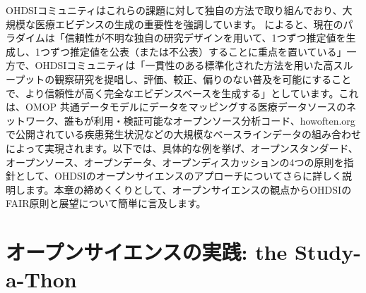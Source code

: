\documentclass[
  11pt]{book}
\theoremstyle{definition}
\theoremstyle{definition}
\theoremstyle{definition}
\theoremstyle{definition}
\theoremstyle{remark}
\begin{document}
OHDSIコミュニティはこれらの課題に対して独自の方法で取り組んでおり、大規模な医療エビデンスの生成の重要性を強調しています。 \citet{schuemie_2018b} によると、現在のパラダイムは「信頼性が不明な独自の研究デザインを用いて、1つずつ推定値を生成し、1つずつ推定値を公表（または不公表）することに重点を置いている」一方で、OHDSIコミュニティは「一貫性のある標準化された方法を用いた高スループットの観察研究を提唱し、評価、較正、偏りのない普及を可能にすることで、より信頼性が高く完全なエビデンスベースを生成する」としています。これは、OMOP 共通データモデルにデータをマッピングする医療データソースのネットワーク、誰もが利用・検証可能なオープンソース分析コード、howoften.org で公開されている疾患発生状況などの大規模なベースラインデータの組み合わせによって実現されます。以下では、具体的な例を挙げ、オープンスタンダード、オープンソース、オープンデータ、オープンディスカッションの4つの原則を指針として、OHDSIのオープンサイエンスのアプローチについてさらに詳しく説明します。本章の締めくくりとして、オープンサイエンスの観点からOHDSIのFAIR原則と展望について簡単に言及します。

\section{オープンサイエンスの実践: the Study-a-Thon}\label{ux30aaux30fcux30d7ux30f3ux30b5ux30a4ux30a8ux30f3ux30b9ux306eux5b9fux8df5-the-study-a-thon}

\end{document}
